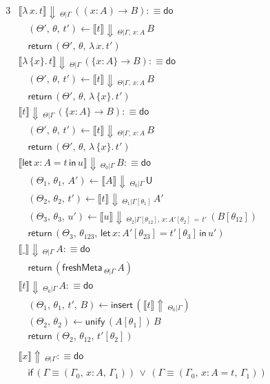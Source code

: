 \documentclass[acmsmall,screen,dvipsnames]{acmart}\settopmatter{}
\newcommand{\slet}{\boldsymbol{\mathsf{let}}}
\renewcommand{\sin}{\boldsymbol{\mathsf{in}}}
\renewcommand{\U}{\mathsf{U}}
\newcommand{\freshMeta}[3]{\mathsf{freshMeta}\,_{#1|#2}\,#3}
\newcommand{\unify}{\mathsf{unify}}
\newcommand{\echeck}[4]{\llbracket#1\rrbracket\!\Downarrow\,_{#2|#3}\,#4}
\newcommand{\einfer}[3]{\llbracket#1\rrbracket\!\Uparrow\,_{#2|#3}}
\newcommand{\edo}{\boldsymbol{\mathsf{do}}}
\newcommand{\ereturn}{\boldsymbol{\mathsf{return}}}
\newcommand{\eif}{\boldsymbol{\mathsf{if}}}
\newcommand{\einsert}{\mathsf{insert}}
\theoremstyle{remark}
\begin{document}
\begin{alignat*}{3}
  &\echeck{\lambda\,x.\,t}{\Theta}{\Gamma}{((x : A)\to B)} :\equiv \edo \\
  &\quad(\Theta',\,\theta,\,t') \leftarrow \echeck{t}{\Theta}{\Gamma,\,x:A} B\\
  &\quad\ereturn\,(\Theta',\,\theta,\,\lambda\,x.\,t')\\
  &\echeck{\lambda\,\{x\}.\,t}{\Theta}{\Gamma}{(\{x : A\}\to B)} :\equiv \edo \\
  &\quad(\Theta',\,\theta,\,t') \leftarrow \echeck{t}{\Theta}{\Gamma,\,x:A} B\\
  &\quad\ereturn\,(\Theta',\,\theta,\,\lambda\,\{x\}.\,t')\\
  &\echeck{t}{\Theta}{\Gamma}{(\{x : A\}\to B)} : \equiv \edo \\
  &\quad (\Theta',\,\theta,\,t') \leftarrow \echeck{t}{\Theta}{\Gamma,\,x:A} B\\
  &\quad \ereturn\,(\Theta',\,\theta,\,\lambda\,\{x\}.\,t')\\
  &\echeck{\slet\,x:A=t\,\sin\,u}{\Theta_0}{\Gamma}{B} :\equiv \edo \\
  &\quad(\Theta_1,\,\theta_1,\,A') \leftarrow \echeck{A}{\Theta_0}{\Gamma}{\U}\\
  &\quad(\Theta_2,\,\theta_2,\,t') \leftarrow \echeck{t}
                {\Theta_1}{\Gamma[\theta_1]}{A'}\\
  &\quad(\Theta_3,\,\theta_3,\,u') \leftarrow
                \echeck{u}{\Theta_2}{\Gamma[\theta_{12}],\,x:A'[\theta_2]\,=\,t'}{(B[\theta_{12}])}\\
  &\quad\ereturn\,(\Theta_3,\,\theta_{123},\,\slet\,x:A'[\theta_{23}]=t'[\theta_3]\,\sin\,u')\\
  &\echeck{\_}{\Theta}{\Gamma}{A} :\equiv \edo \\
  &\quad\ereturn\,(\freshMeta{\Theta}{\Gamma}{A})\\
  &\echeck{t}{\Theta_0}{\Gamma}{A} :\equiv \edo \\
  &\quad(\Theta_1,\,\theta_1,\,t',\,B) \leftarrow \einsert\,(\einfer{t}{\Theta_0}{\Gamma})\\
  &\quad(\Theta_2,\,\theta_2) \leftarrow \unify\,(A[\theta_1])\,B\\
  &\quad\ereturn\,(\Theta_2,\,\theta_{12},\,t'[\theta_2])\\\\
  &\einfer{x}{\Theta}{\Gamma} :\equiv \edo\\
  &\quad\eif\,(\Gamma \equiv (\Gamma_0,\,x : A,\,\Gamma_1))\,\lor\,(\Gamma \equiv (\Gamma_0,\,x : A = t,\,\Gamma_1)) \\

\end{alignat*}
\end{document}
